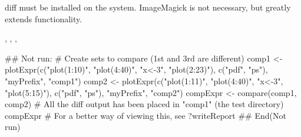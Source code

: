 \documentclass[a4paper,oneside]{report}
\begin{document}
\begin{Note}\relax
{} diff must be installed on the system. ImageMagick is not
necessary, but greatly extends functionality.
\end{Note}
\begin{SeeAlso}\relax
{}, ,
, 
\end{SeeAlso}
\begin{Examples}
\begin{ExampleCode}
## Not run: 
  # Create sets to compare (1st and 3rd are different)
  comp1 <- plotExpr(c("plot(1:10)", "plot(4:40)", "x<-3", "plot(2:23)"),
                    c("pdf", "ps"), "myPrefix", "comp1")
  comp2 <- plotExpr(c("plot(1:11)", "plot(4:40)", "x<-3", "plot(5:15)"),
                    c("pdf", "ps"), "myPrefix", "comp2")
  compExpr <- compare(comp1, comp2)
  # All the diff output has been placed in "comp1" (the test directory)
  compExpr
  # For a better way of viewing this, see ?writeReport
## End(Not run)
\end{ExampleCode}
\end{Examples}
\end{document}
